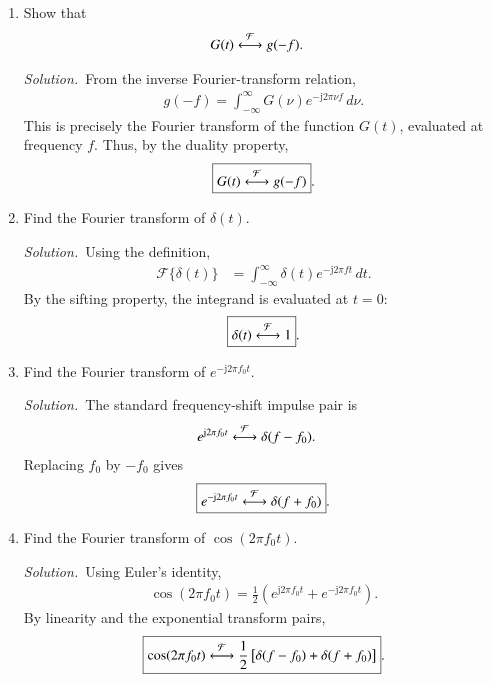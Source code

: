 \documentclass[journal,12pt,twocolumn]{IEEEtran}
\renewcommand\thesection{\arabic{section}}
\newcommand{\jj}{\mathrm{j}}
\providecommand{\solution}{\par\noindent\textit{Solution.}\ }
\begin{document}
\begin{enumerate}[label=\thesection.\arabic*,ref=\thesection.\theenumi]
\item Show that
\begin{align}
    G(t)&\overset{\mathcal{F}}{\longleftrightarrow}g(-f).
\end{align}

\solution From the inverse Fourier-transform relation,
\begin{align}
    g(-f)=\int_{-\infty}^{\infty}G(\nu)e^{-\jj2\pi\nu f}\,d\nu.
\end{align}
This is precisely the Fourier transform of the function $G(t)$, evaluated at frequency $f$. Thus, by the duality property,
\begin{align}
    \boxed{G(t)\overset{\mathcal{F}}{\longleftrightarrow}g(-f)}.
\end{align}

\item Find the Fourier transform of $\delta(t)$.

\solution Using the definition,
\begin{align}
    \mathcal{F}\{\delta(t)\}
    &=\int_{-\infty}^{\infty}\delta(t)e^{-\jj2\pi ft}\,dt.
\end{align}
By the sifting property, the integrand is evaluated at $t=0$:
\begin{align}
    \boxed{\delta(t)\overset{\mathcal{F}}{\longleftrightarrow}1}.
\end{align}

\item Find the Fourier transform of $e^{-\jj2\pi f_0t}$.

\solution The standard frequency-shift impulse pair is
\begin{align}
    e^{\jj2\pi f_0t}&\system{F}\delta(f-f_0).
\end{align}
Replacing $f_0$ by $-f_0$ gives
\begin{align}
    \boxed{e^{-\jj2\pi f_0t}\system{F}\delta(f+f_0)}.
\end{align}

\item Find the Fourier transform of $\cos(2\pi f_0t)$.

\solution Using Euler's identity,
\begin{align}
    \cos(2\pi f_0t)=\frac{1}{2}\left(e^{\jj2\pi f_0t}+e^{-\jj2\pi f_0t}\right).
\end{align}
By linearity and the exponential transform pairs,
\begin{align}
    \boxed{\cos(2\pi f_0t)\overset{\mathcal{F}}{\longleftrightarrow}
    \frac{1}{2}\left[\delta(f-f_0)+\delta(f+f_0)\right]}.
\end{align}


\end{enumerate}
\end{document}

